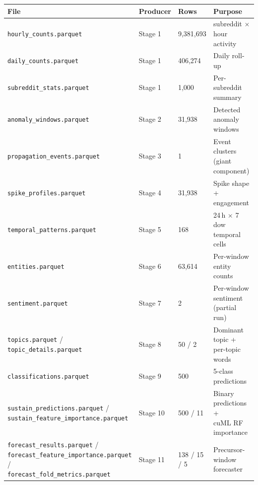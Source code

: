 \documentclass[
]{article}
\begin{document}
\begin{table}[H]
\centering
\begin{adjustbox}{max width=\textwidth}
\begin{tabular}{@{}llll@{}}
\toprule
File & Producer & Rows & Purpose \\
\midrule
\texttt{hourly\_counts.parquet}
  & Stage 1 & 9,381,693
  & subreddit $\times$ hour activity \\
\texttt{daily\_counts.parquet}
  & Stage 1 & 406,274
  & Daily roll-up \\
\texttt{subreddit\_stats.parquet}
  & Stage 1 & 1,000
  & Per-subreddit summary \\
\texttt{anomaly\_windows.parquet}
  & Stage 2 & 31,938
  & Detected anomaly windows \\
\texttt{propagation\_events.parquet}
  & Stage 3 & 1
  & Event clusters (giant component) \\
\texttt{spike\_profiles.parquet}
  & Stage 4 & 31,938
  & Spike shape + engagement \\
\texttt{temporal\_patterns.parquet}
  & Stage 5 & 168
  & 24\,h $\times$ 7 dow temporal cells \\
\texttt{entities.parquet}
  & Stage 6 & 63,614
  & Per-window entity counts \\
\texttt{sentiment.parquet}
  & Stage 7 & 2
  & Per-window sentiment (partial run) \\
\makecell[l]{\texttt{topics.parquet} /\\ \texttt{topic\_details.parquet}}
  & Stage 8 & 50 / 2
  & \makecell[l]{Dominant topic +\\ per-topic words} \\
\texttt{classifications.parquet}
  & Stage 9 & 500
  & 5-class predictions \\
\makecell[l]{\texttt{sustain\_predictions.parquet} /\\ \texttt{sustain\_feature\_importance.parquet}}
  & Stage 10 & 500 / 11
  & \makecell[l]{Binary predictions +\\ cuML RF importance} \\
\makecell[l]{\texttt{forecast\_results.parquet} /\\ \texttt{forecast\_feature\_importance.parquet} /\\ \texttt{forecast\_fold\_metrics.parquet}}
  & Stage 11 & 138 / 15 / 5
  & Precursor-window forecaster \\
\bottomrule
\end{tabular}
\end{adjustbox}
\end{table}
\end{document}

